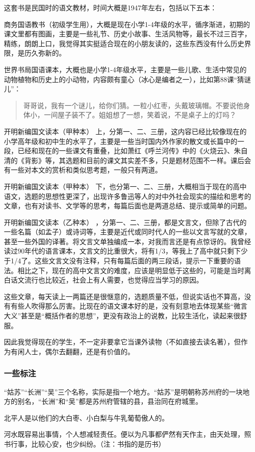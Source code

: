这套书是民国时的语文教材，时间大概是1947年左右，包括以下五本：
\begin{itemize*}
	\item 商务国语教书（初级学生用），大概是现在小学1-4年级的水平，循序渐进，初期的课文里都有图画，主要是一些礼节、历史小故事、生活风物等，最长不过三百字，精练，朗朗上口，我觉得其实挺适合现在的小朋友读的，这些东西没有什么历史界限，是历久弥新的。
	\item 世界书局国语课本，大概也是小学1-4年级水平，主要是一些儿歌、生活中常见的动物植物和历史上的小动物，内容颇有童心（冰心是编者之一），比如第88课“猜谜儿”：
\begin{quotation}
		哥哥说，我有一个谜儿，给你们猜。一粒小红枣，头戴玻璃帽。不要说他身体小，一间屋子装不了。姐姐想了一想，笑着说，不是桌子上的灯吗？
\end{quotation}
	\item 开明新编国文读本（甲种本） 上，分第一、二、三册，这内容已经比较像现在的小学高年级和初中生的水平了，主要是一些当时国内外作家的散文或长篇中的一段，已经和现在的一些课文有重叠，比如萧红《呼兰河传》中的《火烧云》、朱自清的《背影》等，其选题和目前的课文其实差不多，只是题材范围不一样。课后会有一些对本文的赏析和类似思考题，一般只有两道。
	\item 开明新编国文读本（甲种本） 下，也分第一、二、三册，大概相当于现在的高中语文，选题的思想性更深了，出现许多鲁迅等人的对中外社会现实的描绘和思考的文章，也有对读书、文学等的思考，每篇后面也是两道总结、提示或简单的问题。
	\item 开明新编国文读本（乙种本） ，分第一、二、三册，都是文言文，但除了古代的一些名篇（如孟子）或诗词等，主要是近代或同时代人的一些以文言写就的文章，甚至一些外国的译著。将文言文单独编成一本，对我而言还是有点惊讶的。我曾经读过90年代的语言课本，文言文的比重很大，将有1/3，等我上了高中就只剩下少于1/4了。这些文言文没有注释，只有每篇后面的两三段话，提示一下重要的语法。相比之下，现在的高中文言文的难度，应该是明显低于这些的，可能是当时离白话文流行也比较近，社会上有人需要，也觉得应当学习的原因。
\end{itemize*}
	
这些文章，每天读上一两篇还是很惬意的，选题质量不低，但说实话也不算高，没有有些人吹得那么厉害。比现在的语文课本好的是，没有刻意地去体现某些“微言大义”甚至是“概括作者的思想”，更没有政治上的说教，比较生活化，读起来很舒服。

因此我觉得现在的学生，不一定非要拿它当课外读物（不如直接去读名著），但作为有闲人士，偶尔去翻翻，还是有价值的。

\subsubsection{一些标注}

“姑苏”“长洲”“吴”三个名称，实际是指一个地方。“姑苏”是明朝称苏州府的一块地方的别名，“长洲”和“吴”都是苏州府管辖的县，县治同在府城里。

北平人是以他们的大白枣、小白梨与牛乳葡萄傲人的。

河水既容易出事情，个人想减轻责任。便以为凡事都俨然有天作主，由天处理，照书行事，比较心安，也少纠纷。（注：书指的是历书）

	

